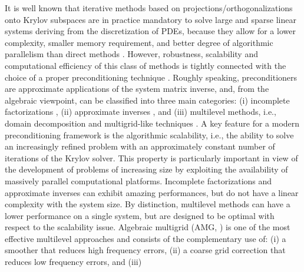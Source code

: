 \documentclass[3p,times]{elsarticle}
\theoremstyle{plain}
\begin{document}
It is well known that iterative methods based on projections/orthogonalizations onto Krylov subspaces \cite{saad2003iterative} are in practice mandatory to solve large and sparse linear systems deriving from the discretization of
PDEs, because they allow for a lower complexity, smaller memory requirement, and better degree of
algorithmic parallelism than  direct methods \cite{davis2006direct}.
However, robustness, scalability and computational efficiency of this class of methods is tightly connected with the choice of a proper preconditioning technique \cite{saad2003iterative}. Roughly speaking, preconditioners are approximate applications of the system matrix inverse, and, from the algebraic viewpoint, can be
classified into three main categories: (i) incomplete factorizations \cite{saad1994ilut,
lin1999incomplete, benzi2002preconditioning}, (ii) approximate inverses
\cite{benzi1996sparse, tang1999toward, huckle2003factorized,janfergam10,janfer11, janna2015fsaipack}, and (iii)
multilevel methods, i.e., domain decomposition \cite{janfergam13,dolean2015introduction,
zampini2016pcbddc, badia2016multilevel, li2017low} and multigrid-like techniques
\cite{mccormick1982multigrid, stuben1983algebraic, brandt1986algebraic, stuben2001review,
notay2012aggregation, brezina2005adaptive, vanvek1996algebraic, brezina2006adaptive,
brandt2011bootstrap, brandt2014bootstrap,
Pasetto20171159, dambra2018bootcmatch, dambra2019improving,
paludetto2019novel}. A key feature for a modern preconditioning framework is the
algorithmic scalability, i.e., the ability to solve an increasingly refined problem with an approximately
constant number of iterations of the Krylov solver. This property is particularly important in view of the development of problems of increasing size by exploiting the availability of massively parallel computational platforms. Incomplete factorizations and approximate inverses can exhibit amazing performances, but do
not have a linear complexity with the system size. By distinction, multilevel methods can have a lower performance on a single system, but are designed to be optimal with respect to the scalability issue. Algebraic multigrid (AMG, \cite{xu2017algebraic}) is one of the most effective multilevel
approaches and consists of the complementary use of: (i) a smoother that reduces high
frequency errors, (ii) a coarse grid correction that reduces low frequency errors, and (iii)
\end{document}
